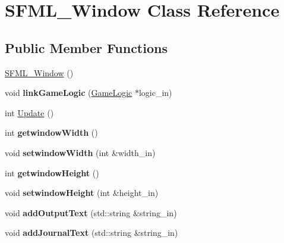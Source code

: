 \hypertarget{class_s_f_m_l___window}{}\section{S\+F\+M\+L\+\_\+\+Window Class Reference}
\label{class_s_f_m_l___window}
\subsection*{Public Member Functions}
\begin{DoxyCompactItemize}
\item 
\hyperlink{class_s_f_m_l___window_a590949c104b8bff7d97db0db88bc5e54}{S\+F\+M\+L\+\_\+\+Window} ()
\item 
\mbox{\label{class_s_f_m_l___window_a251513c222f339faf8d02660d34ee5f8}} 
void {\bfseries link\+Game\+Logic} (\hyperlink{class_game_logic}{Game\+Logic} $\ast$logic\+\_\+in)
\item 
int \hyperlink{class_s_f_m_l___window_a9ebb1be5a71a001270bb42a65e4a7a29}{Update} ()
\item 
\mbox{\label{class_s_f_m_l___window_a19289261ae6dff17a4975bb9c88b403c}} 
int {\bfseries getwindow\+Width} ()
\item 
\mbox{\label{class_s_f_m_l___window_a1f9c018e9fee47e14f81e86b0bf011ca}} 
void {\bfseries setwindow\+Width} (int \&width\+\_\+in)
\item 
\mbox{\label{class_s_f_m_l___window_aeadf16863fd8000192fab449d18a1662}} 
int {\bfseries getwindow\+Height} ()
\item 
\mbox{\label{class_s_f_m_l___window_a363be84a5a6a0401daf1ee641369cc30}} 
void {\bfseries setwindow\+Height} (int \&height\+\_\+in)
\item 
\mbox{\label{class_s_f_m_l___window_a589a8dcac571b7eb749e22aee1955e84}} 
void {\bfseries add\+Output\+Text} (std\+::string \&string\+\_\+in)
\item 
\mbox{\label{class_s_f_m_l___window_a728e23abf1d926421d873b17ca0d67b5}} 
void {\bfseries add\+Journal\+Text} (std\+::string \&string\+\_\+in)

\end{DoxyCompactItemize}
